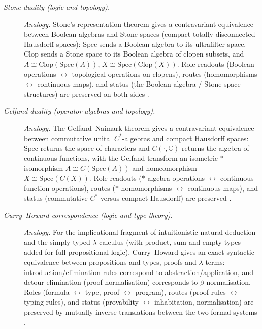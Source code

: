 \begin{description}
\item[\emph{Stone duality (logic and topology).}] \textit{Analogy.}
Stone's representation theorem gives a contravariant equivalence
between Boolean algebras and Stone spaces (compact totally
disconnected Hausdorff spaces): \(\mathrm{Spec}\) sends a Boolean
algebra to its ultrafilter space, \(\mathrm{Clop}\) sends a Stone
space to its Boolean algebra of clopen subsets, and
\(A\cong\mathrm{Clop}(\mathrm{Spec}(A))\),
\(X\cong\mathrm{Spec}(\mathrm{Clop}(X))\).  Role readouts (Boolean
operations \(\leftrightarrow\) topological operations on clopens),
routes (homomorphisms \(\leftrightarrow\) continuous maps), and
status (the Boolean-algebra / Stone-space structures) are
preserved on both sides
\citep{Stone1936RepresentationsBooleanAlgebras}.

\item[\emph{Gelfand duality (operator algebras and topology).}] \textit{Analogy.}
The Gelfand--Naimark theorem gives a contravariant equivalence
between commutative unital \(C^*\)-algebras and compact Hausdorff
spaces: \(\mathrm{Spec}\) returns the space of characters and
\(C(\cdot,\mathbb C)\) returns the algebra of continuous functions,
with the Gelfand transform an isometric \(*\)-isomorphism
\(A\cong C(\mathrm{Spec}(A))\) and homeomorphism
\(X\cong\mathrm{Spec}(C(X))\).  Role readouts (\(*\)-algebra
operations \(\leftrightarrow\) continuous-function operations),
routes (\(*\)-homomorphisms \(\leftrightarrow\) continuous maps),
and status (commutative-\(C^*\) versus compact-Hausdorff) are
preserved
\citep{GelfandNaimark1943NormedRings}.

\item[\emph{Curry--Howard correspondence (logic and type theory).}] \textit{Analogy.}
For the implicational fragment of intuitionistic natural deduction
and the simply typed \(\lambda\)-calculus (with product, sum and
empty types added for full propositional logic), Curry--Howard gives an exact syntactic
equivalence between propositions and types, proofs and
\(\lambda\)-terms: introduction/elimination rules correspond to
abstraction/application, and detour
elimination (proof normalisation) corresponds to
\(\beta\)-normalisation.  Roles (formula \(\leftrightarrow\) type,
proof \(\leftrightarrow\) program), routes (proof rules
\(\leftrightarrow\) typing rules), and status (provability
\(\leftrightarrow\) inhabitation, normalisation) are preserved by
mutually inverse translations between the two formal systems
\citep{Howard1980FormulaeAsTypes}.


\end{description}
